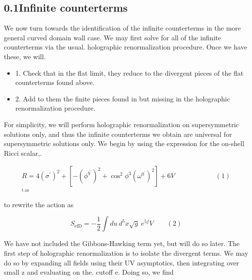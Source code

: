 \documentclass{article}
\begin{document}
\sloppy

\subsection*{0.1Infinite counterterms}


We now turn towards the identification of the infinite counterterms in the more general
curved domain wall case. We may first solve for all of the infinite counterterms via the usual.
holographic renormalization procedure. Once we have these, we will.

\begin{itemize}
\item 1. Check that in the flat limit, they reduce to the divergent pieces of the flat counterterms
found above.

\item 2. Add to them the finite pieces found in but missing in the holographic renormalization
procedure.

\end{itemize}

For simplicity, we will perform holographic renormalization on supersymmetric solutions
only, and thus the infinite counterterms we obtain are universal for supersymmetric solutions
only. We begin by using the expression for the on-shell Ricci scalar,.


\begin{equation}
\begin{array} { c } { R = 4 ( \sigma ^ { \prime } ) ^ { 2 } + \left [ - ( \phi ^ { 9 ^ { \prime } } ) ^ { 2 } + \cos ^ { 2 } \phi ^ { 3 } ( { \omega ^ { 0 ^ { \prime } } } ) ^ { 2 } \right ] + 6 V \qquad \qquad \qquad ( 1 ) } \\ { _ { \mathrm { t ~ a s } } } \end{array}
\end{equation}


to rewrite the action as


\begin{equation}
S _ { \mathrm { e f D } } = - \frac { 1 } { 2 } \int d u ~ d ^ { 5 } x \sqrt { g } ~ e ^ { 5 f } V \qquad ( 2 )
\end{equation}


We have not included the Gibbons-Hawking term yet, but will do so later. The first step of
holographic renormalization is to isolate the divergent terms. We may do so by expanding
all fields using their UV asymptotics, then integrating over small z and evaluating on the.
cutoff e. Doing so, we find
\end{document}

